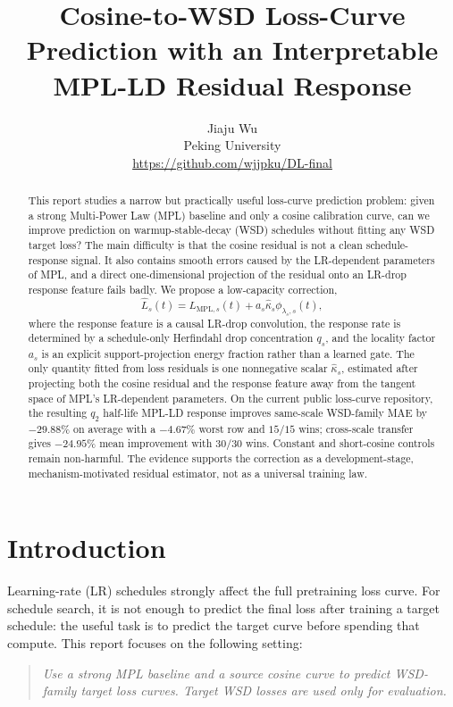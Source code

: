 \documentclass{article}
\title{Cosine-to-WSD Loss-Curve Prediction with an Interpretable MPL-LD Residual Response}
\author{%
  Jiaju Wu \\
  Peking University \\
  \url{https://github.com/wjjpku/DL-final} \\
}
\newcommand{\MPL}{\mathrm{MPL}}
\begin{document}
\maketitle

\begin{abstract}
This report studies a narrow but practically useful loss-curve prediction problem: given a
strong Multi-Power Law (MPL) baseline and only a cosine calibration curve, can we improve
prediction on warmup-stable-decay (WSD) schedules without fitting any WSD target loss?
The main difficulty is that the cosine residual is not a clean schedule-response signal.
It also contains smooth errors caused by the LR-dependent parameters of MPL, and a direct
one-dimensional projection of the residual onto an LR-drop response feature fails badly.
We propose a low-capacity correction,
\[
  \widehat L_s(t)=L_{\MPL,s}(t)+a_s\widehat\kappa_s\phi_{\lambda_s,s}(t),
\]
where the response feature is a causal LR-drop convolution, the response rate is determined
by a schedule-only Herfindahl drop concentration \(q_s\), and the locality factor \(a_s\)
is an explicit support-projection energy fraction rather than a learned gate.  The only
quantity fitted from loss residuals is one nonnegative scalar \(\widehat\kappa_s\), estimated
after projecting both the cosine residual and the response feature away from the tangent
space of MPL's LR-dependent parameters.  On the current public loss-curve repository, the
resulting \(q_2\) half-life MPL-LD response improves same-scale WSD-family MAE by
\(-29.88\%\) on average with a \(-4.67\%\) worst row and \(15/15\) wins; cross-scale
transfer gives \(-24.95\%\) mean improvement with \(30/30\) wins.  Constant and short-cosine
controls remain non-harmful.  The evidence supports the correction as a development-stage,
mechanism-motivated residual estimator, not as a universal training law.
\end{abstract}

\section{Introduction}
Learning-rate (LR) schedules strongly affect the full pretraining loss curve.  For schedule
search, it is not enough to predict the final loss after training a target schedule: the
useful task is to predict the target curve before spending that compute.  This report focuses
on the following setting:

\begin{quote}
\emph{Use a strong MPL baseline and a source cosine curve to predict WSD-family target
loss curves.  Target WSD losses are used only for evaluation.}
\end{quote}
\end{document}
